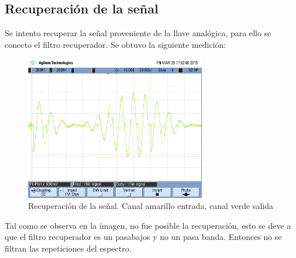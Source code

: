 \documentclass[../../ASSD_TP1_G7.tex]{subfiles}
\begin{document}
\subsection*{Recuperación de la se\~nal}
Se intento recuperar la se\~nal proveniente de la llave analógica, para ello se conecto el filtro recuperador. Se obtuvo la siguiente medición:

\begin{figure}[H]
  \centering
   \includegraphics[width=0.7\textwidth]{figures/lla_8_1.png}
  \caption{Recuperación de la se\~nal. Canal amarillo entrada, canal verde salida }
  
\end{figure}
Tal como se observa en la imagen, no fue posible la recuperación, esto se deve a que el filtro recuperador es un pasabajos y no un pasa banda. Entonces no se filtran las repeticiones del espectro.
\end{document}
